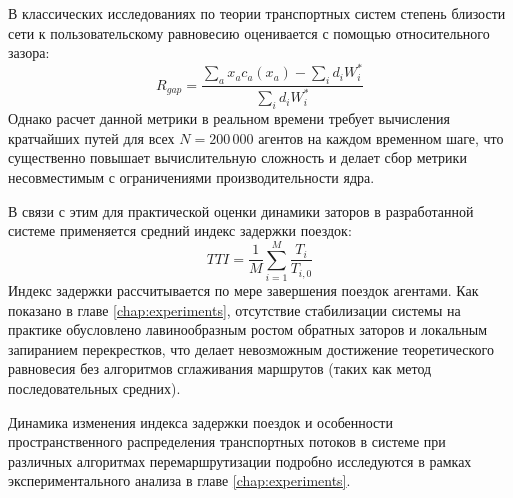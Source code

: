 В классических исследованиях по теории транспортных систем \cite{sheffi1985urban, peeta2001foundations} степень близости сети к пользовательскому равновесию оценивается с помощью относительного зазора:
\begin{equation}
    R_{gap} = \frac{\sum_{a} x_a c_a(x_a) - \sum_{i} d_i W^*_i}{\sum_{i} d_i W^*_i}
\end{equation}
Однако расчет данной метрики в реальном времени требует вычисления кратчайших путей для всех $N = 200\,000$ агентов на каждом временном шаге, что существенно повышает вычислительную сложность и делает сбор метрики несовместимым с ограничениями производительности ядра.

В связи с этим для практической оценки динамики заторов в разработанной системе применяется средний индекс задержки поездок:
\begin{equation}
    TTI = \frac{1}{M} \sum_{i=1}^{M} \frac{T_i}{T_{i, 0}}
\end{equation}
Индекс задержки рассчитывается по мере завершения поездок агентами. Как показано в главе \ref{chap:experiments}, отсутствие стабилизации системы на практике обусловлено лавинообразным ростом обратных заторов и локальным запиранием перекрестков, что делает невозможным достижение теоретического равновесия без алгоритмов сглаживания маршрутов (таких как метод последовательных средних).

Динамика изменения индекса задержки поездок и особенности пространственного распределения транспортных потоков в системе при различных алгоритмах перемаршрутизации подробно исследуются в рамках экспериментального анализа в главе \ref{chap:experiments}.
